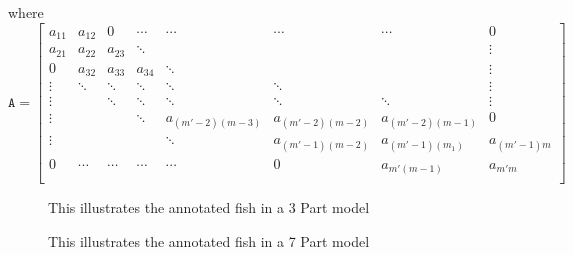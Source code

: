 where
 \begin{equation}
\mathtt{A} =
\begin{bmatrix}
a_{11}  & a_{12}  & 0 & \cdots & \cdots & \cdots & \cdots & 0 \\
a_{21}  & a_{22}  & a_{23}  & \ddots & && & \vdots \\
0 & a_{32}  & a_{33} & a_{34}  & \ddots & &  & \vdots \\
\vdots & \ddots & \ddots & \ddots & \ddots & \ddots &  & \vdots \\
\vdots & & \ddots & \ddots & \ddots & \ddots & \ddots& \vdots\\
\vdots  &  & & \ddots & a_{(m'-2)(m-3)}  & a_{(m'-2)(m-2)}  &  a_{(m'-2)(m-1)}  & 0\\
\vdots  &  & & & \ddots & a_{(m'-1)(m-2)}  & a_{(m'-1)(m_1)}  &  a_{(m'-1)m}\\
0 & \cdots &  \cdots & \cdots & \cdots & 0 & a_{m'(m-1)} & a_{m'm}  \\
\end{bmatrix}
 \end{equation}


\begin{figure}
\begin{adjustwidth}{-1in}{-1in} 
\label{fig:anotated1}
\centering     %
{}
\caption{This illustrates the annotated fish in a 3 Part model}
\end{adjustwidth}
\end{figure}

\begin{figure}
\begin{adjustwidth}{-1in}{-1in} 
\label{fig:anotated1}
\centering     %
{}
\caption{This illustrates the annotated fish in a 7 Part model}
\end{adjustwidth}
\end{figure}

